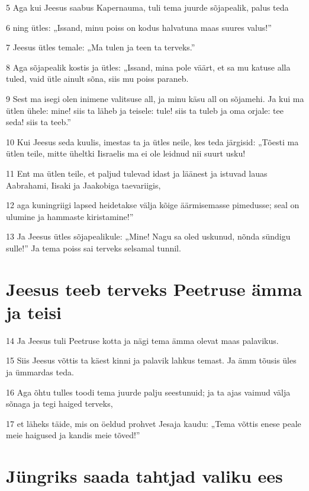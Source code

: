 \par 5 Aga kui Jeesus saabus Kapernauma, tuli tema juurde sõjapealik, palus teda
\par 6 ning ütles: „Issand, minu poiss on kodus halvatuna maas suures valus!”
\par 7 Jeesus ütles temale: „Ma tulen ja teen ta terveks.”
\par 8 Aga sõjapealik kostis ja ütles: „Issand, mina pole väärt, et sa mu katuse alla tuled, vaid ütle ainult sõna, siis mu poiss paraneb.
\par 9 Sest ma isegi olen inimene valitsuse all, ja minu käsu all on sõjamehi. Ja kui ma ütlen ühele: mine! siis ta läheb ja teisele: tule! siis ta tuleb ja oma orjale: tee seda! siis ta teeb.”
\par 10 Kui Jeesus seda kuulis, imestas ta ja ütles neile, kes teda järgisid: „Tõesti ma ütlen teile, mitte üheltki Iisraelis ma ei ole leidnud nii suurt usku!
\par 11 Ent ma ütlen teile, et paljud tulevad idast ja läänest ja istuvad lauas Aabrahami, Iisaki ja Jaakobiga taevariigis,
\par 12 aga kuningriigi lapsed heidetakse välja kõige äärmisemasse pimedusse; seal on ulumine ja hammaste kiristamine!”
\par 13 Ja Jeesus ütles sõjapealikule: „Mine! Nagu sa oled uskunud, nõnda sündigu sulle!” Ja tema poiss sai terveks selsamal tunnil.

\section*{Jeesus teeb terveks Peetruse ämma ja teisi}

\par 14 Ja Jeesus tuli Peetruse kotta ja nägi tema ämma olevat maas palavikus.
\par 15 Siis Jeesus võttis ta käest kinni ja palavik lahkus temast. Ja ämm tõusis üles ja ümmardas teda.
\par 16 Aga õhtu tulles toodi tema juurde palju seestunuid; ja ta ajas vaimud välja sõnaga ja tegi haiged terveks,
\par 17 et läheks täide, mis on öeldud prohvet Jesaja kaudu: „Tema võttis enese peale meie haigused ja kandis meie tõved!”

\section*{Jüngriks saada tahtjad valiku ees}

